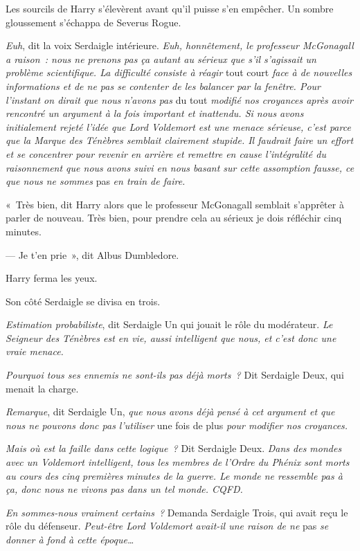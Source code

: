 Les sourcils de Harry s'élevèrent avant qu'il puisse s'en empêcher.
Un sombre gloussement s'échappa de Severus Rogue.

\emph{Euh}, dit la voix Serdaigle intérieure.
\emph{Euh, honnêtement, le professeur McGonagall a raison~: nous ne prenons pas ça autant au sérieux que s'il s'agissait un problème scientifique.
La difficulté consiste à réagir} tout court \emph{face à de nouvelles informations et de ne pas se contenter de les balancer par la fenêtre.
Pour l'instant on dirait que nous n'avons pas} du tout \emph{modifié nos croyances après avoir rencontré un argument à la fois important et inattendu.
Si nous avons initialement rejeté l'idée que Lord Voldemort est une menace sérieuse, c'est parce que la Marque des Ténèbres semblait clairement stupide.
Il faudrait faire un effort et se concentrer pour revenir en arrière et remettre en cause l'intégralité du raisonnement que nous avons suivi en nous basant sur cette assomption fausse, ce que nous ne sommes} pas \emph{en train de faire.}

«~Très bien, dit Harry alors que le professeur McGonagall semblait s'apprêter à parler de nouveau.
Très bien, pour prendre cela au sérieux je dois réfléchir cinq minutes.

--- Je t'en prie~», dit Albus Dumbledore.

Harry ferma les yeux.

Son côté Serdaigle se divisa en trois.

\emph{Estimation probabiliste}, dit Serdaigle Un qui jouait le rôle du modérateur.
\emph{Le Seigneur des Ténèbres est en vie, aussi intelligent que nous, et c'est donc une vraie menace.}

\emph{Pourquoi tous ses ennemis ne sont-ils pas déjà morts~?} Dit Serdaigle Deux, qui menait la charge.

\emph{Remarque}, dit Serdaigle Un, \emph{que nous avons déjà pensé à cet argument et que nous ne pouvons donc pas l'utiliser} une fois de plus \emph{pour modifier nos croyances.}

\emph{Mais où est la faille dans cette logique~?} Dit Serdaigle Deux.
\emph{Dans des mondes avec un Voldemort intelligent, tous les membres de l'Ordre du Phénix sont morts au cours des cinq premières minutes de la guerre.
Le monde ne ressemble pas à ça, donc nous ne vivons pas dans un tel monde.
CQFD.}

\emph{En sommes-nous vraiment certains~?} Demanda Serdaigle Trois, qui avait reçu le rôle du défenseur.
\emph{Peut-être Lord Voldemort avait-il une raison de ne} pas \emph{se donner à fond à cette époque…}

